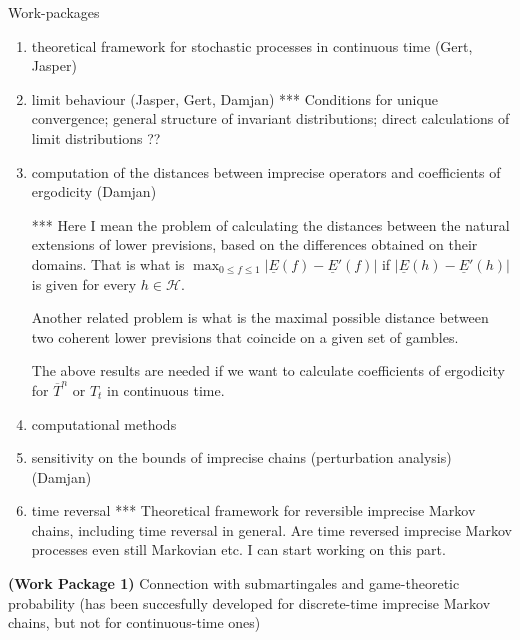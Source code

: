 \documentclass[11pt,dvipsnames,usenames,a4paper]{article}
\begin{document}
Work-packages
\begin{enumerate}
\item theoretical framework for stochastic processes in continuous time (Gert, Jasper)
\item limit behaviour (Jasper, Gert, Damjan)
*** Conditions for unique convergence; general structure of invariant distributions; direct calculations of limit distributions ??
\item computation of the distances between imprecise operators and coefficients of ergodicity (Damjan)

 *** Here I mean the problem of calculating the distances between the natural extensions of lower previsions, based on the differences obtained on their domains. That is what is $\max_{0\le f \le 1} |\underline E(f)-\underline E'(f)|$ if $ |\underline E(h)-\underline E'(h)|$ is given for every $h \in \mathcal H$. 
 
 Another related problem is what is the maximal possible distance between two coherent lower previsions that coincide on a given set of gambles. 
 
 The above results are needed if we want to calculate coefficients of ergodicity for $\overline T^n$ or $T_t$ in continuous time. 
\item computational methods 
\item sensitivity on the bounds of imprecise chains (perturbation analysis) (Damjan)
\item time reversal 
*** Theoretical framework for reversible imprecise Markov chains, including time reversal in general. Are time reversed imprecise Markov processes even still Markovian etc. I can start working on this part. 
\end{enumerate}

{\bf(Work Package 1)} Connection with submartingales and game-theoretic probability (has been succesfully developed for discrete-time imprecise Markov chains, but not for continuous-time ones)


\end{document}
